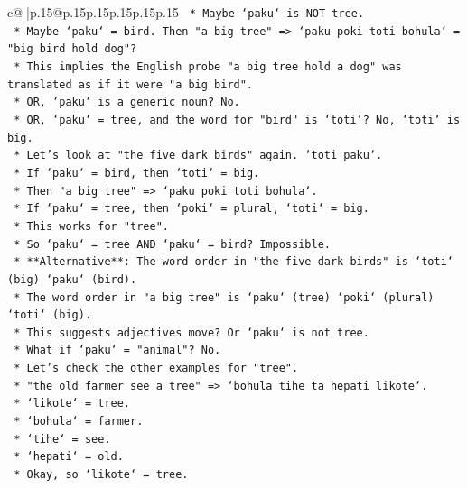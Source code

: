 \documentclass{article}
\begin{document}
{\begin{supertabular}{c@{$\;$}|p{.15\linewidth}@{}p{.15\linewidth}p{.15\linewidth}p{.15\linewidth}p{.15\linewidth}p{.15\linewidth}}
{{{\texttt{                *   Maybe `paku` is NOT tree.} \\
\texttt{                *   Maybe `paku` = bird. Then "a big tree" => `paku poki toti bohula` = "big bird hold dog"?} \\
\texttt{                *   This implies the English probe "a big tree hold a dog" was translated as if it were "a big bird".} \\
\texttt{                *   OR, `paku` is a generic noun? No.} \\
\texttt{                *   OR, `paku` = tree, and the word for "bird" is `toti`? No, `toti` is big.} \\
\texttt{                *   Let's look at "the five dark birds" again. `toti paku`.} \\
\texttt{                *   If `paku` = bird, then `toti` = big.} \\
\texttt{                *   Then "a big tree" => `paku poki toti bohula`.} \\
\texttt{                *   If `paku` = tree, then `poki` = plural, `toti` = big.} \\
\texttt{                *   This works for "tree".} \\
\texttt{                *   So `paku` = tree AND `paku` = bird? Impossible.} \\
\texttt{                *   **Alternative**: The word order in "the five dark birds" is `toti` (big) `paku` (bird).} \\
\texttt{                *   The word order in "a big tree" is `paku` (tree) `poki` (plural) `toti` (big).} \\
\texttt{                *   This suggests adjectives move? Or `paku` is not tree.} \\
\texttt{                *   What if `paku` = "animal"? No.} \\
\texttt{                *   Let's check the other examples for "tree".} \\
\texttt{                *   "the old farmer see a tree" => `bohula tihe ta hepati likote`.} \\
\texttt{                    *   `likote` = tree.} \\
\texttt{                    *   `bohula` = farmer.} \\
\texttt{                    *   `tihe` = see.} \\
\texttt{                    *   `hepati` = old.} \\
\texttt{                *   Okay, so `likote` = tree.} \\
}}}
\end{supertabular}}
\end{document}
